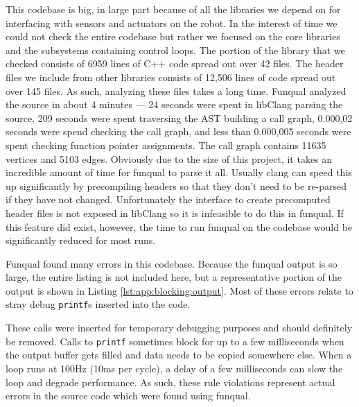 This codebase is big, in large part because of all the libraries we depend on for interfacing with sensors and actuators on the robot.  In the interest of time we could not check the entire codebase but rather we focused on the core libraries and the subsystems containing control loops.  The portion of the library that we checked consists of 6959 lines of C++ code spread out over 42 files.  The header files we include from other libraries consists of 12,506 lines of code spread out over 145 files.  As such, analyzing these files takes a long time.  Funqual analyzed the source in about 4 minutes --- 24 seconds were spent in libClang parsing the source, 209 seconds were spent traversing the AST building a call graph, 0.000,02 seconds were spend checking the call graph, and less than 0.000,005 seconds were spent checking function pointer assignments.  The call graph contains 11635 vertices and 5103 edges.  Obviously due to the size of this project, it takes an incredible amount of time for funqual to parse it all.  Usually clang can speed this up significantly by precompiling headers so that they don't need to be re-parsed if they have not changed.  Unfortunately the interface to create precomputed header files is not exposed in libClang so it is infeasible to do this in funqual.  If this feature did exist, however, the time to run funqual on the codebase would be significantly reduced for most runs.

Funqual found many errors in this codebase.  Because the funqual output is so large, the entire listing is not included here, but a representative portion of the output is shown in Listing \ref{lst:app:blocking:output}.  Most of these errors relate to stray debug \lstinline{printf}s inserted into the code.  

These calls were inserted for temporary debugging purposes and should definitely be removed.  Calls to \lstinline{printf} sometimes block for up to a few milliseconds when the output buffer gets filled and data needs to be copied somewhere else.  When a loop runs at 100Hz (10ms per cycle), a delay of a few milliseconds can slow the loop and degrade performance.  As such, these rule violations represent actual errors in the source code which were found using funqual.  

